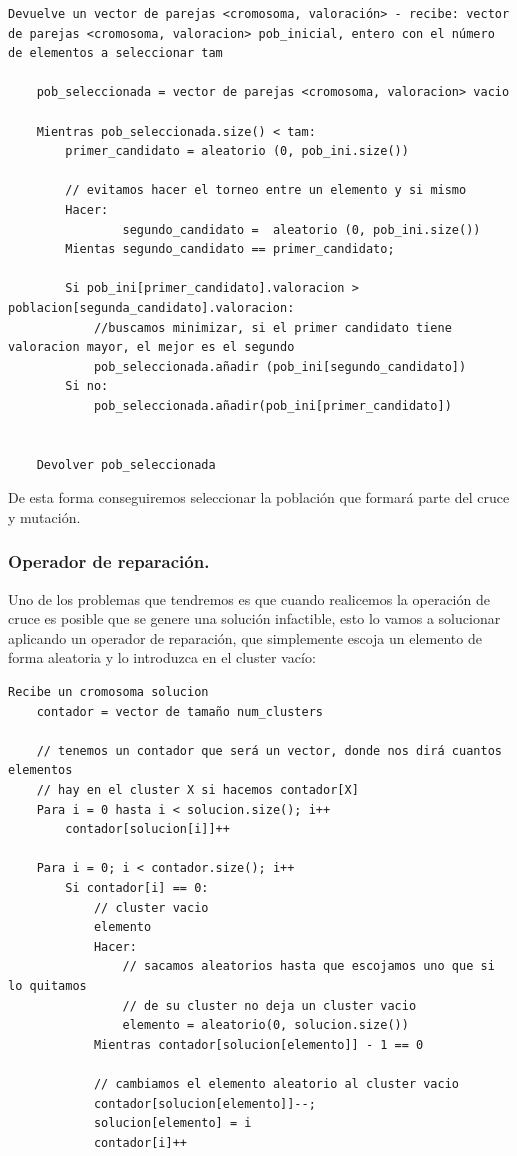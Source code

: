\documentclass[12pt, spanish]{article}
\begin{document}
\begin{lstlisting}
Devuelve un vector de parejas <cromosoma, valoración> - recibe: vector de parejas <cromosoma, valoracion> pob_inicial, entero con el número de elementos a seleccionar tam

	pob_seleccionada = vector de parejas <cromosoma, valoracion> vacio
	
	Mientras pob_seleccionada.size() < tam:
		primer_candidato = aleatorio (0, pob_ini.size())
		
		// evitamos hacer el torneo entre un elemento y si mismo
		Hacer:
				segundo_candidato =  aleatorio (0, pob_ini.size())
		Mientas segundo_candidato == primer_candidato;
		
		Si pob_ini[primer_candidato].valoracion > poblacion[segunda_candidato].valoracion:
			//buscamos minimizar, si el primer candidato tiene valoracion mayor, el mejor es el segundo
			pob_seleccionada.añadir (pob_ini[segundo_candidato])
		Si no:
			pob_seleccionada.añadir(pob_ini[primer_candidato])


	Devolver pob_seleccionada
\end{lstlisting}

De esta forma conseguiremos seleccionar la población que formará parte del cruce y mutación.


\subsubsection{Operador de reparación.}

Uno de los problemas que tendremos es que cuando realicemos la operación de cruce es posible que se genere una solución infactible, esto lo vamos a solucionar aplicando un operador de reparación, que simplemente escoja un elemento de forma aleatoria y lo introduzca en el cluster vacío:

\begin{lstlisting}
Recibe un cromosoma solucion
	contador = vector de tamaño num_clusters
	
	// tenemos un contador que será un vector, donde nos dirá cuantos elementos 
	// hay en el cluster X si hacemos contador[X]
	Para i = 0 hasta i < solucion.size(); i++
		contador[solucion[i]]++
		
	Para i = 0; i < contador.size(); i++
		Si contador[i] == 0:
			// cluster vacio
			elemento
			Hacer:
				// sacamos aleatorios hasta que escojamos uno que si lo quitamos
				// de su cluster no deja un cluster vacio
				elemento = aleatorio(0, solucion.size()) 
			Mientras contador[solucion[elemento]] - 1 == 0
				
			// cambiamos el elemento aleatorio al cluster vacio
			contador[solucion[elemento]]--;
			solucion[elemento] = i
			contador[i]++		
\end{lstlisting}
\end{document}
